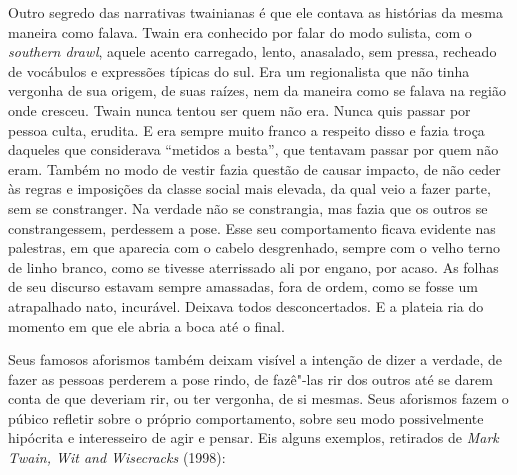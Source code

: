 Outro segredo das narrativas twainianas é que ele contava as histórias da
mesma maneira como falava. Twain era conhecido por falar do modo sulista,
com o \textit{southern drawl}, aquele acento carregado, lento, anasalado, sem
pressa, recheado de vocábulos e expressões típicas do sul. Era um
regionalista que não tinha vergonha de sua origem, de suas raízes, nem da
maneira como se falava na região onde cresceu. Twain nunca tentou ser quem não era. Nunca quis passar por pessoa culta,
erudita. E era sempre muito franco a respeito disso e fazia troça daqueles
que considerava ``metidos a besta'', que tentavam passar
por quem não eram. Também no modo de vestir fazia questão de causar
impacto, de não ceder às regras e imposições da classe social mais
elevada, da qual veio a fazer parte, sem se constranger. Na verdade não se
constrangia, mas fazia que os outros se constrangessem, perdessem a
pose. Esse seu comportamento ficava evidente nas palestras, em que
aparecia com o cabelo desgrenhado, sempre com o velho terno de linho
branco, como se tivesse aterrissado ali por engano, por acaso. As folhas
de seu discurso estavam sempre amassadas, fora de ordem, como se fosse um
atrapalhado nato, incurável. Deixava todos desconcertados. E a plateia ria do momento em que ele abria a boca até o final.

Seus famosos aforismos também deixam visível a intenção de dizer a
verdade, de fazer as pessoas perderem a pose rindo, de fazê"-las rir dos
outros até se darem conta de que deveriam rir, ou ter vergonha, de si mesmas.
Seus aforismos fazem o púbico refletir sobre o próprio comportamento,
sobre seu modo possivelmente hipócrita e interesseiro de agir e pensar. Eis
alguns exemplos, retirados de \textit{Mark Twain, Wit and Wisecracks} (1998): 

